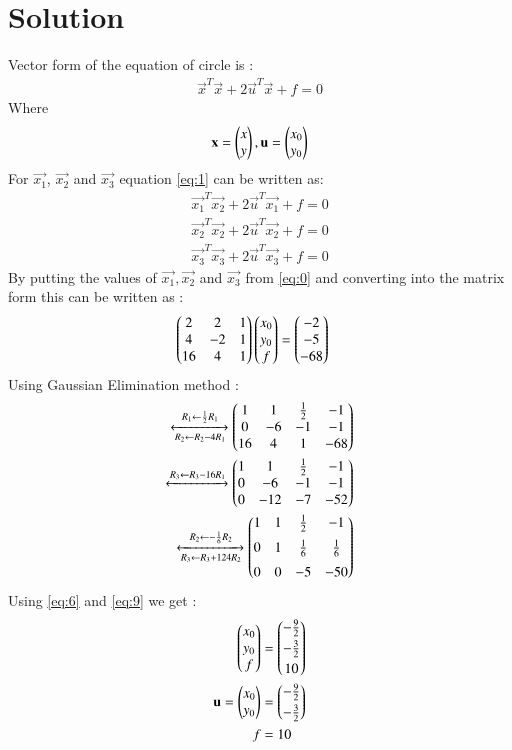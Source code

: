 \documentclass[journal,12pt,twocolumn]{IEEEtran}
\begin{document}
\section{\textbf{Solution}}
Vector form of the equation of circle is :
\begin{align}
\vec{x}^T\vec{x}+2\vec{u}^T\vec{x}+f=0\label{eq:1}
\end{align}
Where
\begin{align}
\mathbf{x}=\begin{pmatrix}x\\y\end{pmatrix}, \mathbf{u}=\begin{pmatrix}x_0\\y_0\end{pmatrix} 
\end{align}
For $\vec{x_1}$, $\vec{x_2}$ and $\vec{x_3}$ equation \eqref{eq:1} can be written as:
\begin{align}
\vec{x_1}^T\vec{x_2}+2\vec{u}^T\vec{x_1}+f=0\\
\vec{x_2}^T\vec{x_2}+2\vec{u}^T\vec{x_2}+f=0\\
\vec{x_3}^T\vec{x_3}+2\vec{u}^T\vec{x_3}+f=0
\end{align}
By putting the values of $\vec{x_1},\vec{x_2}$ and $\vec{x_3}$ from \eqref{eq:0} and converting into the matrix form this can be written as : 
\begin{align}
 \begin{pmatrix}2&2&1\\4&-2&1\\16&4&1\end{pmatrix}\begin{pmatrix}x_0\\y_0\\f\end{pmatrix}&=\begin{pmatrix}-2\\-5\\-68\end{pmatrix} \label{eq:6}
\end{align}
Using Gaussian Elimination method :
\begin{align}
\xleftrightarrow[R_2 \leftarrow R_2-4R_1]{R_1 \leftarrow \frac{1}{2}R_1}\begin{pmatrix}1&1&\frac{1}{2}&-1\\0&-6&-1&-1\\16&4&1&-68\end{pmatrix}\\
\xleftrightarrow{R_3 \leftarrow R_3-16R_1}\begin{pmatrix}1&1&\frac{1}{2}&-1\\0&-6&-1&-1\\0&-12&-7&-52\end{pmatrix}\\
\xleftrightarrow[R_3 \leftarrow R_3+124R_2]{R_2 \leftarrow -\frac{1}{6}R_2}\begin{pmatrix}1&1&\frac{1}{2}&-1\\[0.2cm]0&1&\frac{1}{6}&\frac{1}{6}\\[0.2cm]0&0&-5&-50\end{pmatrix}\label{eq:9}
\end{align}
Using \eqref{eq:6} and \eqref{eq:9} we get : 
\begin{align}
\begin{pmatrix}x_0\\y_0\\f\end{pmatrix}&=\begin{pmatrix}-\frac{9}{2}\\[0.1cm]-\frac{3}{2}\\[0.1cm]10\end{pmatrix}\\
\mathbf{u}=\begin{pmatrix}x_0\\y_0\end{pmatrix}&=\begin{pmatrix}-\frac{9}{2}\\[0.1cm]-\frac{3}{2}\end{pmatrix}\\
f&=10   
\end{align}
\end{document}

